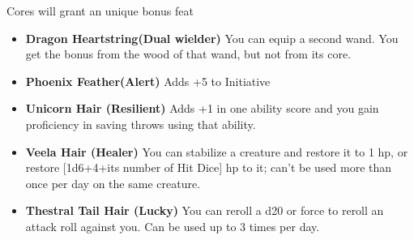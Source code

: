 Cores will grant an unique bonus feat\\
\begin{itemize}
    \item \textbf{Dragon Heartstring(Dual wielder)} You can equip a second wand. You get the bonus from the wood of that wand, but not from its core.

    \item \textbf{Phoenix Feather(Alert)} Adds +5 to Initiative

    \item \textbf{Unicorn Hair (Resilient)} Adds +1 in one ability score and you gain proficiency in saving throws using that ability. 

    \item \textbf{Veela Hair (Healer)} You can stabilize a creature and restore it to 1 hp, or restore [1d6+4+its number of Hit Dice] hp to it; can't be used more than once per day on the same creature.

    \item \textbf{Thestral Tail Hair (Lucky)} You can reroll a d20 or force to reroll an attack roll against you. Can be used up to 3 times per day.

\end{itemize}
\pagebreak